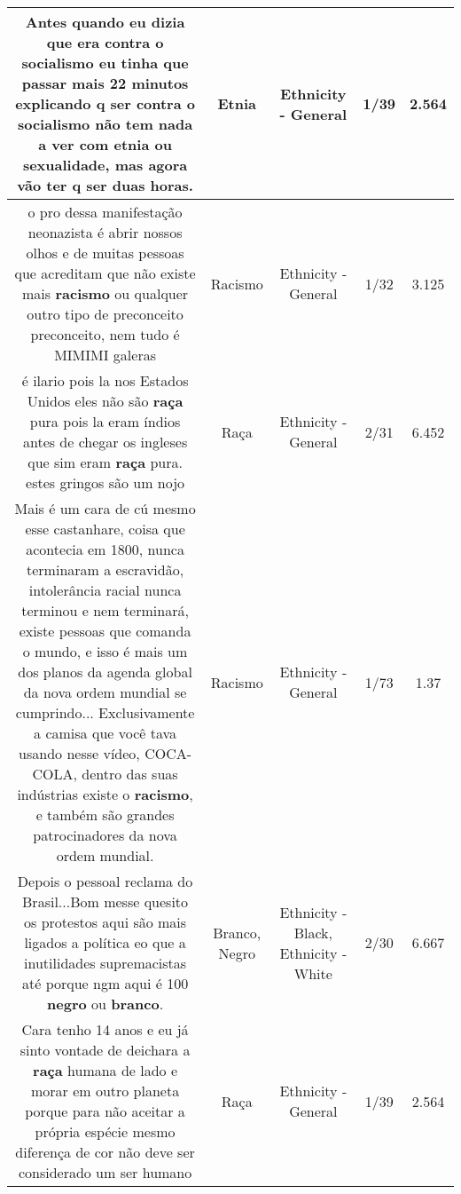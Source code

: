 \documentclass[11pt]{article}
\newlength\mylength
\begin{document}
\begin{center}
\begin{longtable}{|C{.65\mylength}|C{.30\mylength}|C{.12\mylength}|C{.12\mylength}|C{.12\mylength}|}
  \small Antes quando eu dizia que era contra o socialismo eu tinha que passar mais 22 minutos explicando q ser contra o socialismo não tem nada a ver com \textbf{etnia} ou sexualidade, mas agora vão ter q ser duas horas.\normalsize   & Etnia & Ethnicity - General & 1/39 & 2.564 \\  \hline
  \small o pro dessa manifestação neonazista é abrir nossos olhos e de muitas pessoas que acreditam que não existe mais \textbf{racismo} ou qualquer outro tipo de preconceito preconceito, nem tudo é MIMIMI galeras\normalsize   & Racismo & Ethnicity - General & 1/32 & 3.125 \\  \hline
  \small é ilario pois la nos Estados Unidos eles não são \textbf{raça} pura pois la eram índios antes de chegar os ingleses que sim eram \textbf{raça} pura. estes gringos são um nojo\normalsize   & Raça & Ethnicity - General & 2/31 & 6.452 \\  \hline
  \small Mais é um cara de cú mesmo esse castanhare,  coisa que acontecia em 1800, nunca terminaram a escravidão, intolerância racial nunca terminou e nem terminará, existe pessoas que comanda o mundo, e isso é mais um dos planos da agenda global da nova ordem mundial se cumprindo... Exclusivamente a camisa que você tava usando nesse vídeo, COCA-COLA, dentro das suas indústrias existe o \textbf{racismo}, e também são grandes patrocinadores da nova ordem mundial.\normalsize   & Racismo & Ethnicity - General & 1/73 & 1.37 \\  \hline
  \small Depois o pessoal reclama do Brasil...Bom messe quesito os protestos aqui são mais ligados a política eo que a inutilidades supremacistas até porque ngm aqui é 100 \textbf{negro} ou \textbf{branco}.\normalsize   & Branco, Negro & Ethnicity - Black, Ethnicity - White & 2/30 & 6.667 \\  \hline
  \small Cara tenho 14 anos e eu já sinto vontade de deichara a \textbf{raça} humana de lado e morar em outro planeta porque para não aceitar a própria espécie mesmo diferença de cor não deve ser considerado um ser humano\normalsize   & Raça & Ethnicity - General & 1/39 & 2.564 \\  \hline

\end{longtable}
\end{center}
\end{document}
